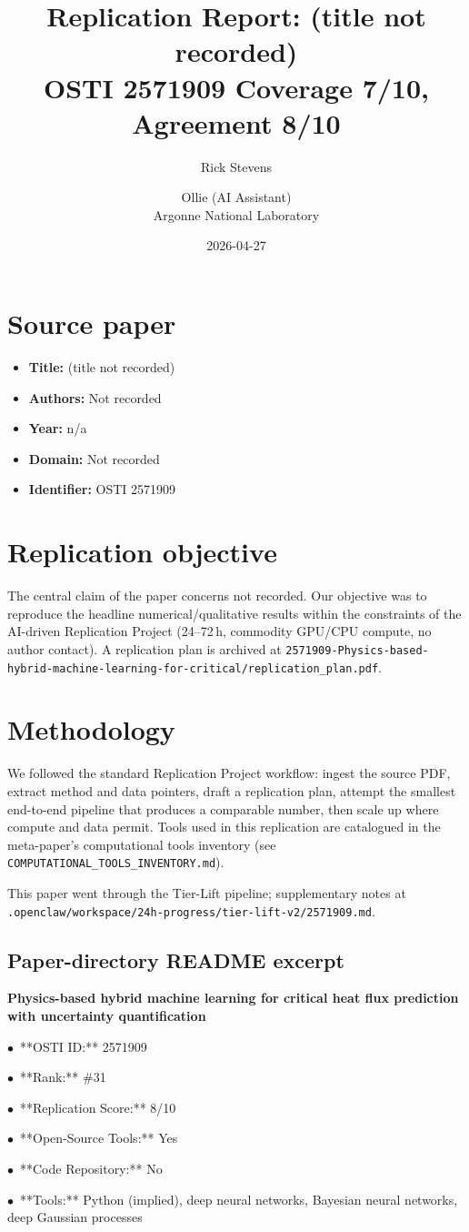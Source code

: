 \documentclass[11pt]{article}
\title{Replication Report: (title not recorded)\\[2pt]\large OSTI 2571909 \textbar{} Coverage 7/10, Agreement 8/10}
\author{Rick Stevens \and Ollie (AI Assistant)\\\small Argonne National Laboratory}
\date{2026-04-27}
\begin{document}
\maketitle

\section{Source paper}
\begin{itemize}
\item \textbf{Title:} (title not recorded)
\item \textbf{Authors:} Not recorded
\item \textbf{Year:} n/a
\item \textbf{Domain:} Not recorded
\item \textbf{Identifier:} OSTI 2571909
\end{itemize}


\section{Replication objective}
The central claim of the paper concerns not recorded. Our objective was to reproduce the headline numerical/qualitative results within the constraints of the AI-driven Replication Project (24--72\,h, commodity GPU/CPU compute, no author contact). A replication plan is archived at \texttt{2571909-Physics-based-hybrid-machine-learning-for-critical/replication\_plan.pdf}.

\section{Methodology}
We followed the standard Replication Project workflow: ingest the source PDF, extract method and data pointers, draft a replication plan, attempt the smallest end-to-end pipeline that produces a comparable number, then scale up where compute and data permit. Tools used in this replication are catalogued in the meta-paper's computational tools inventory (see \texttt{COMPUTATIONAL\_TOOLS\_INVENTORY.md}).

This paper went through the Tier-Lift pipeline; supplementary notes at \texttt{.openclaw/workspace/24h-progress/tier-lift-v2/2571909.md}.

\subsection*{Paper-directory README excerpt}
\small
\par\medskip\textbf{Physics-based hybrid machine learning for critical heat flux prediction with uncertainty quantification}\par
\par$\bullet$\ **OSTI ID:** 2571909
\par$\bullet$\ **Rank:** \#31
\par$\bullet$\ **Replication Score:** 8/10
\par$\bullet$\ **Open-Source Tools:** Yes
\par$\bullet$\ **Code Repository:** No
\par$\bullet$\ **Tools:** Python (implied), deep neural networks, Bayesian neural networks, deep Gaussian processes
\end{document}
